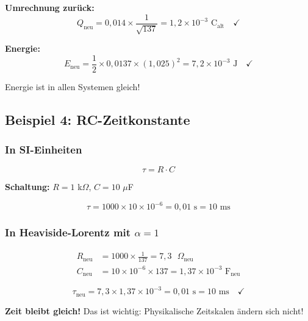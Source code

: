 	\textbf{Umrechnung zurück:}
	\begin{equation}
		Q_{\text{neu}} = 0{,}014 \times \frac{1}{\sqrt{137}} = 1{,}2 \times 10^{-3} \text{ C}_{\text{alt}} \quad \checkmark
	\end{equation}
	
	\textbf{Energie:}
	\begin{equation}
		E_{\text{neu}} = \frac{1}{2} \times 0{,}0137 \times (1{,}025)^2 = 7{,}2 \times 10^{-3} \text{ J} \quad \checkmark
	\end{equation}
	
	Energie ist in allen Systemen gleich!
	
	\subsection{Beispiel 4: RC-Zeitkonstante}
	
	\subsubsection{In SI-Einheiten}
	
	\begin{equation}
		\tau = R \cdot C
	\end{equation}
	
	\textbf{Schaltung:} $R = 1$ k$\Omega$, $C = 10$ $\mu$F
	
	\begin{equation}
		\tau = 1000 \times 10 \times 10^{-6} = 0{,}01 \text{ s} = 10 \text{ ms}
	\end{equation}
	
	\subsubsection{In Heaviside-Lorentz mit $\alpha = 1$}
	
	\begin{align}
		R_{\text{neu}} &= 1000 \times \frac{1}{137} = 7{,}3 \text{ }\Omega_{\text{neu}} \\
		C_{\text{neu}} &= 10 \times 10^{-6} \times 137 = 1{,}37 \times 10^{-3} \text{ F}_{\text{neu}}
	\end{align}
	
	\begin{equation}
		\tau_{\text{neu}} = 7{,}3 \times 1{,}37 \times 10^{-3} = 0{,}01 \text{ s} = 10 \text{ ms} \quad \checkmark
	\end{equation}
	
	\textbf{Zeit bleibt gleich!} Das ist wichtig: Physikalische Zeitskalen ändern sich nicht!
	
